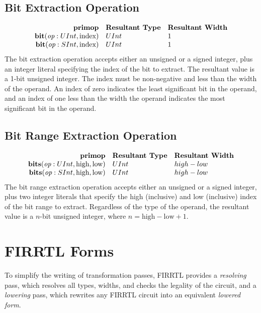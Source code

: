 \documentclass[10pt]{article}
\begin{document}
\subsection{Bit Extraction Operation}
\[
\begin{array}{rll}
\text{\bf primop} & \text{\bf Resultant Type} & \text{\bf Resultant Width} \\
\text{\bf bit}(\text{\em op}:UInt, \text{index})  & UInt & 1    \\
\text{\bf bit}(\text{\em op}:SInt, \text{index})  & UInt & 1    \\
\end{array}
\]
The bit extraction operation accepts either an unsigned or a signed integer, plus an integer literal specifying the index of the bit to extract.
The resultant value is a 1-bit unsigned integer.
The index must be non-negative and less than the width of the operand.
An index of zero indicates the least significant bit in the operand, and an index of one less than the width the operand indicates the most significant bit in the operand.

\subsection{Bit Range Extraction Operation}
\[
\begin{array}{rll}
\text{\bf primop} & \text{\bf Resultant Type} & \text{\bf Resultant Width} \\
\text{\bf bits}(\text{\em op}:UInt, \text{high}, \text{low})  & UInt & high - low    \\
\text{\bf bits}(\text{\em op}:SInt, \text{high}, \text{low})  & UInt & high - low    \\
\end{array}
\]
The bit range extraction operation accepts either an unsigned or a signed integer, plus two integer literals that specify the high (inclusive) and low (inclusive) index of the bit range to extract.
Regardless of the type of the operand, the resultant value is a $n$-bit unsigned integer, where $n = \text{high} - \text{low} + 1$. 

\section{FIRRTL Forms}

To simplify the writing of transformation passes, FIRRTL provides a {\em resolving} pass, which resolves all types, widths, and checks the legality of the circuit, and a {\em lowering} pass, which rewrites any FIRRTL circuit into an equivalent {\em lowered form}.
\end{document}
